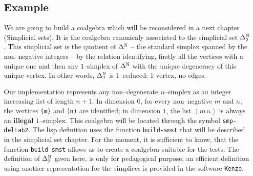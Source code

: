 \subsection* {Example}

We  are going to build a coalgebra  which will be reconsidered in a next chapter (Simplicial sets).
It is the coalgebra canonicaly associated to the simplicial set $\Delta_2^{{\Bbb N}}$. This simplicial set is the
quotient of $\Delta^{{\Bbb N}}$ -- the standard simplex spanned by the non--negative integers -- by the relation
identifying, firstly all the vertices with a unique one  and then any $1$--simplex of $\Delta^{{\Bbb N}}$ with the
unique degeneracy of this unique vertex. In other words, $\Delta_2^{{\Bbb N}}$ is $1$--reduced: $1$ vertex, no edges. \par
Our implementation represents any non--degenerate $n$--simplex as an integer increasing list of length $n+1$.
In dimension $0$, for every non--negative $m$ and $n$, the vertices {\tt (m)} and {\tt (n)} are identified; in
dimension $1$, the list $(m\, n)$ is always an {\bf illegal} $1$--simplex. 
This coalgebra will be located through the symbol {\tt smp-deltab2}. The lisp definition uses the function
{\tt build-smst} that will be described in the simplicial set chapter. For the moment, it is
sufficient to know, that the function {\tt build-smst} allows us to create a coalgebra
suitable for the tests. The definition  of $\Delta_2^{{\Bbb N}}$ given here, is only for pedagogical 
purpose, an efficient definition    using another representation for the simplices
is provided in the software {\tt Kenzo}.

